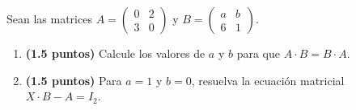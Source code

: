 
Sean las matrices $A=\begin{pmatrix}0&2\\3&0\end{pmatrix}$ y $B=\begin{pmatrix}a&b\\6&1\end{pmatrix}$.
\begin{enumerate}[label=\alph*)]
\item \textbf{(1.5 puntos)} Calcule los valores de $a$ y $b$ para que $A\cdot B=B\cdot A$.
\item \textbf{(1.5 puntos)} Para $a=1$ y $b=0$, resuelva la ecuación matricial $X\cdot B-A=I_2$.
\end{enumerate}
